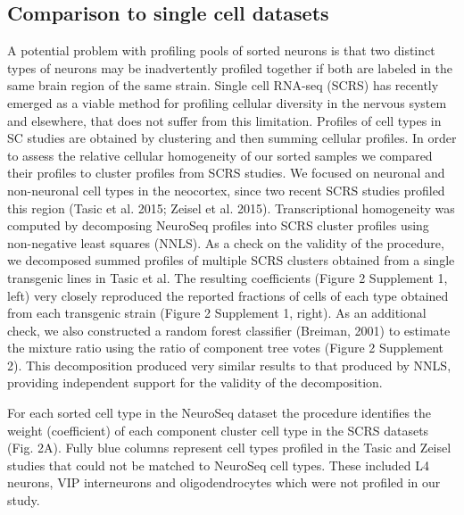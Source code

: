 \subsection{Comparison to single cell datasets}
A potential problem with profiling pools of sorted neurons is that two distinct types of neurons may be inadvertently profiled together if both are labeled in the same brain region of the same strain. Single cell RNA-seq (SCRS) has recently emerged as a viable method for profiling cellular diversity in the nervous system and elsewhere, that does not suffer from this limitation. Profiles of cell types in SC studies are obtained by clustering and then summing cellular profiles. In order to assess the relative cellular homogeneity of our sorted samples we compared their profiles to cluster profiles from SCRS studies. We focused on neuronal and non-neuronal cell types in the neocortex, since two recent SCRS studies profiled this region (Tasic et al. 2015; Zeisel et al. 2015). Transcriptional homogeneity was computed by decomposing NeuroSeq profiles into SCRS cluster profiles using non-negative least squares (NNLS). As a check on the validity of the procedure, we decomposed summed profiles of multiple SCRS clusters obtained from a single transgenic lines in Tasic et al. The resulting coefficients (Figure 2 Supplement 1, left) very closely reproduced the reported fractions of cells of each type obtained from each transgenic strain (Figure 2 Supplement 1, right). As an additional check, we also constructed a random forest classifier (Breiman, 2001) to estimate the mixture ratio using the ratio of component tree votes (Figure 2 Supplement 2). This decomposition produced very similar results to that produced by NNLS, providing independent support for the validity of the decomposition. 

For each sorted cell type in the NeuroSeq dataset the procedure identifies the weight (coefficient) of each component cluster cell type in the SCRS datasets (Fig. 2A). Fully blue columns represent cell types profiled in the Tasic and Zeisel studies that could not be matched to NeuroSeq cell types. These included L4 neurons, VIP interneurons and oligodendrocytes which were not profiled in our study. 

